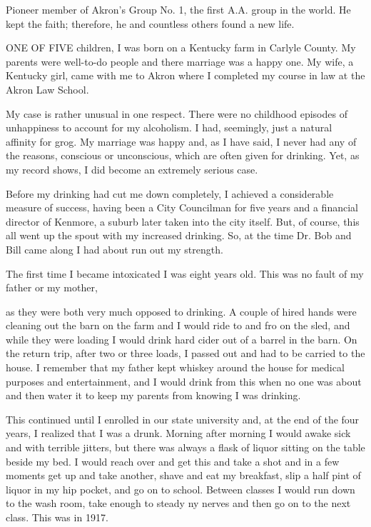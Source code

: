 
\bbChapterPreamble


\begin{biblechapter}
    Pioneer member of Akron’s Group No. 1, 
    the first A.A. group in the world.
\verse He kept the faith; 
    therefore, he and countless others found a new life.
\end{biblechapter}


\begin{biblechapter}
    ONE OF FIVE children, 
    I was born on a Kentucky farm in Carlyle County.
\verse My parents were well-to-do people and there marriage was a happy one.
\verse My wife, a Kentucky girl, 
    came with me to Akron 
    where I completed my course in law at the Akron Law School.

\verse My case is rather unusual in one respect. There were no childhood episodes of unhappiness to account for my alcoholism. I had, seemingly, just a natural affinity for grog. My marriage was happy and, as I have said, I never had any of the reasons, conscious or unconscious, which are often given for drinking. Yet, as my record shows, I did become an extremely serious case.

Before my drinking had cut me down completely, I achieved a considerable measure of success, having been a City Councilman for five years and a financial director of Kenmore, a suburb later taken into the city itself. But, of course, this all went up the spout with my increased drinking. So, at the time Dr. Bob and Bill came along I had about run out my strength.

The first time I became intoxicated I was eight years old. This was no fault of my father or my mother,

as they were both very much opposed to drinking. A couple of hired hands were cleaning out the barn on the farm and I would ride to and fro on the sled, and while they were loading I would drink hard cider out of a barrel in the barn. On the return trip, after two or three loads, I passed out and had to be carried to the house. I remember that my father kept whiskey around the house for medical purposes and entertainment, and I would drink from this when no one was about and then water it to keep my parents from knowing I was drinking.

This continued until I enrolled in our state university and, at the end of the four years, I realized that I was a drunk. Morning after morning I would awake sick and with terrible jitters, but there was always a flask of liquor sitting on the table beside my bed. I would reach over and get this and take a shot and in a few moments get up and take another, shave and eat my breakfast, slip a half pint of liquor in my hip pocket, and go on to school. Between classes I would run down to the wash room, take enough to steady ny nerves and then go on to the next class. This was in 1917.


\end{biblechapter}

